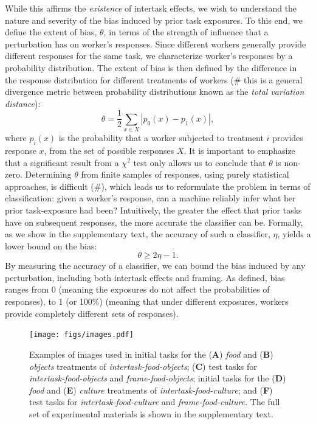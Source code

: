\documentclass[12pt]{article}
\begin{document}
While this affirms the \textit{existence} of intertask effects, we wish to
understand the nature and severity of the bias induced by prior task 
exposures.  To this end, we define the extent of bias, $\theta$, in terms of
the strength of influence that a perturbation has on worker's responses.
Since different workers generally provide different responses for the same 
task, we characterize worker's responses by a probability distribution.  
The extent of bias is then defined by the difference in the response 
distribution for different treatments of workers
(\# this is a general divergence metric between probability 
distributions known as the \textit{total variation distance}):
\begin{equation}
	\theta = \frac{1}{2}\sum_{x \in X} \left| p_0(x) - p_1(x) \right|,
	\label{eq:theta}
\end{equation}
where $p_i(x)$ is the probability that a worker subjected to treatment $i$
provides response $x$, from the set of possible responses $X$.
It is important to emphasize that a significant result from a $\chi^2$ test 
only allows us to conclude that $\theta$ is non-zero.  Determining $\theta$ from finite samples of 
responses, using purely statistical approaches, is difficult (\#), which 
leads us to reformulate the
problem in terms of classification: given a worker's 
response, can a machine reliably infer what her prior task-exposure had 
been?  Intuitively, the greater the effect that prior tasks have on subsequent
responses, the more accurate the classifier can be.  Formally, as we show
in the supplementary text, the accuracy of such a classifier, $\eta$,
yields a lower bound on the bias:
\begin{equation}
	\theta \geq 2\eta - 1.
	\label{l1}
\end{equation}
By measuring the accuracy of a classifier, we can bound the 
bias induced by any perturbation, including both intertask effects and 
framing.  As defined, bias ranges from 0 (meaning the exposures 
do not affect the probabilities of responses), to 1 
(or 100\%) (meaning that under different exposures, workers provide completely
different sets of responses).

\begin{figure}
	\centering
	\texttt{[image: figs/images.pdf]}
	\caption{
		Examples of images used in
		initial tasks for the (\textbf{A}) \textit{food} and (\textbf{B}) 
		\textit{objects} treatments of \textit{intertask-food-objects};
		(\textbf{C}) test tasks for \textit{intertask-food-objects} and 
		\textit{frame-food-objects};
		initial tasks for the (\textbf{D}) \textit{food} and (\textbf{E}) 
		\textit{culture} treatments of \textit{intertask-food-culture};
		and (\textbf{F}) test tasks for \textit{intertask-food-culture} and 
		\textit{frame-food-culture}.
		The full set of experimental materials is shown in the 
		supplementary text.
	}

	\label{fig:task}
\end{figure}
\end{document}

